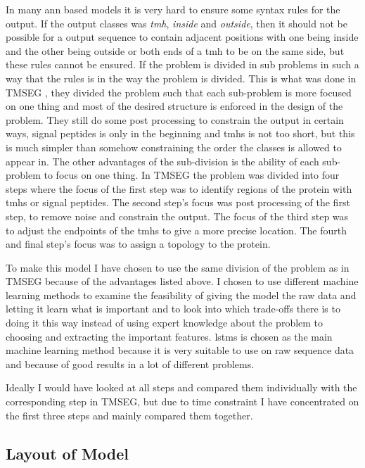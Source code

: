 In many \gls{ann} based models it is very hard to ensure some syntax rules for the output. If the output 
classes was \emph{\gls{tmh}}, \emph{inside} and \emph{outside}, then it should not be possible for a output sequence to contain 
adjacent positions with one being inside and the other being outside or both ends of a \gls{tmh} to be on the 
same side, but these rules cannot be ensured. If the problem is divided in sub problems in such a way that 
the rules is in the way the problem is divided. This is what was done in TMSEG \cite{tmseg}, they divided 
the problem such that each sub-problem is more focused on one thing and most of the desired structure is 
enforced in the design of the problem. They still do some post processing to constrain the output in certain ways, 
signal peptides is only in the beginning and \glspl{tmh} is not too short, but this is much simpler than 
somehow constraining the order the classes is allowed to appear in. The other advantages of the sub-division 
is the ability of each sub-problem to focus on one thing. In TMSEG the problem was divided into four steps
where the focus of the first step was to identify regions of the protein with \glspl{tmh} or signal peptides.
The second step's focus was post processing of the first step, to remove noise and constrain the output.
The focus of the third step was to adjust the endpoints of the \glspl{tmh} to give a more precise location.
The fourth and final step's focus was to assign a topology to the protein. 

To make this model I have chosen to use the same division of the problem as in TMSEG because of the 
advantages listed above. I chosen to use different machine learning methods to examine the feasibility 
of giving the model the raw data and letting it learn what is important and to look into which trade-offs
there is to doing it this way instead of using expert knowledge about the problem to choosing and extracting 
the important features. \glspl{lstm} is chosen as the main machine learning method because it is very suitable
to use on raw sequence data and because of good results in a lot of different problems. 

Ideally I would have looked at all steps and compared them individually with the corresponding step in TMSEG,
but due to time constraint I have concentrated on the first three steps and mainly compared them together.

\subsection{Layout of Model}

